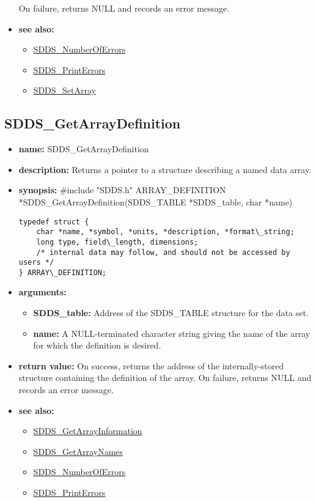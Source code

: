 \documentclass[11pt]{article}
\newcommand{\progref}[1]{\hyperref{SDDS_#1}{{\tt SDDS\_#1} (}{)}{SDDS_#1}}
\begin{document}
\begin{itemize}
\newline
On failure, returns NULL and records an error message. 
\item {\bf see also:}
\begin{itemize}
\item \progref{NumberOfErrors}
\item \progref{PrintErrors}
\item \progref{SetArray}
\end{itemize}
\end{itemize}

\subsection{SDDS\_GetArrayDefinition}
\label{SDDS_GetArrayDefinition}

\begin{itemize}
\item {\bf name:}\newline
SDDS\_GetArrayDefinition
\item {\bf description:}\newline
Returns a pointer to a structure describing a named data array.
\item {\bf synopsis:} \#include "SDDS.h"\newline
ARRAY\_DEFINITION *SDDS\_GetArrayDefinition(SDDS\_TABLE *SDDS\_table, char *name)\newline
\begin{verbatim}
typedef struct {
    char *name, *symbol, *units, *description, *format\_string;
    long type, field\_length, dimensions;
    /* internal data may follow, and should not be accessed by users */
} ARRAY\_DEFINITION;
\end{verbatim}
\item {\bf arguments:}
\begin{itemize}
\item {\bf SDDS\_table:} Address of the SDDS\_TABLE structure for the data set.
\item {\bf name:} A NULL-terminated character string giving the name of the array for which the definition is desired.
\end{itemize}
\item {\bf return value:}\newline
On success, returns the address of the internally-stored structure containing the definition of the array. On failure, returns NULL and records an error message.
\item {\bf see also:}
\begin{itemize}
\item \progref{GetArrayInformation}
\item \progref{GetArrayNames}
\item \progref{NumberOfErrors}
\item \progref{PrintErrors}
\end{itemize}
\end{itemize}
\end{document}
